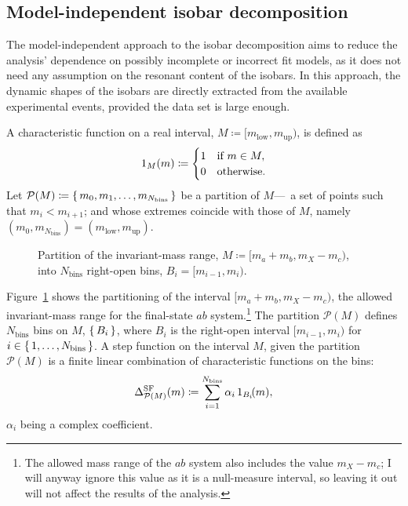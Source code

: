 \subsection{Model-independent isobar decomposition}
\label{sec:model_independent_isobar_decomposition}

    The model-independent approach to the isobar decomposition aims to reduce the analysis' dependence on possibly incomplete or incorrect fit models, as it does not need any assumption on the resonant content of the isobars.
    In this approach, the dynamic shapes of the isobars are directly extracted from the available experimental events, provided the data set is large enough.
    

    A characteristic function on a real interval, $M \coloneqq [m_{\text{low}}, m_{\text{up}})$, is defined as
    \begin{equation}
        1_M(m) \coloneqq 
        \begin{cases}
            1 &\text{if }m \in M, \\
            0 &\text{otherwise}.
        \end{cases}
    \end{equation}
    Let $\mathcal{P}(M) \coloneqq \set{m_0, m_1,\dots, m_{N_\text{bins}}}$ be a partition of $M$---\ie~a set of points such that $m_{i} < m_{i+1}$; and whose extremes coincide with those of $M$, namely $(m_0, m_{N_\text{bins}}) = (m_{\text{low}}, m_{\text{up}})$.
    \begin{figure}
        \centering
        
        \caption[Partition of the invariant-mass range into $N_\text{bins}$ right-open bins.]%
        {Partition of the invariant-mass range, $M \coloneqq [m_a+m_b,m_X - m_c)$, into $N_\text{bins}$ right-open bins, $B_i = [m_{i-1}, m_i)$.}
        \label{fig:invariant-mass-partition}
    \end{figure}
    Figure~\ref{fig:invariant-mass-partition} shows the partitioning of the interval $[m_a+m_b,m_X-m_c)$, the allowed invariant-mass range for the final-state $ab$ system.\footnote{The allowed mass range of the $ab$ system also includes the value $m_X - m_c$; I will anyway ignore this value as it is a null-measure interval, so leaving it out will not affect the results of the analysis.}
    The partition $\mathcal{P}(M)$ defines $N_\text{bins}$ bins on $M$, $\set{B_i}$, where $B_i$ is the right-open interval $[m_{i-1},m_i)$ for $i\in\set{1,\dots, N_\text{bins}}$.
    A step function on the interval $M$, given the partition $\mathcal{P}(M)$ is a finite linear combination of characteristic functions on the bins:
    \begin{equation}\label{eq:step_dynamic_shape}
        \Delta_{\mathcal{P}(M)}^{\text{SF}}(m) \coloneqq \sum_{i = 1}^{N_\text{bins}} \alpha_i\, 1_{B_i}\!(m),
    \end{equation}
    $\alpha_i$ being a complex coefficient.


